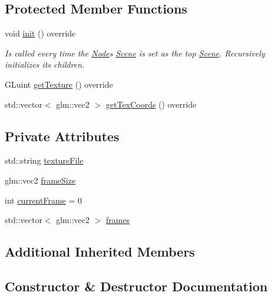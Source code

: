 \subsection*{Protected Member Functions}
\begin{DoxyCompactItemize}
\item 
void \mbox{\hyperlink{classsage_1_1Sprite_aeaf5c7aa5aeff1b0a4da9e66430f1c42}{init}} () override
\begin{DoxyCompactList}\small\item\em Is called every time the \mbox{\hyperlink{classsage_1_1Node}{Node}}\textquotesingle{}s \mbox{\hyperlink{classsage_1_1Scene}{Scene}} is set as the top \mbox{\hyperlink{classsage_1_1Scene}{Scene}}. Recursively initializes its children. \end{DoxyCompactList}\item 
G\+Luint \mbox{\hyperlink{classsage_1_1Sprite_aa75f3595b809f99847a9642ce2bf319a}{get\+Texture}} () override
\item 
std\+::vector$<$ glm\+::vec2 $>$ \mbox{\hyperlink{classsage_1_1Sprite_a3e5acc98484d2f326fdd1ff622cfd2ff}{get\+Tex\+Coords}} () override
\end{DoxyCompactItemize}
\subsection*{Private Attributes}
\begin{DoxyCompactItemize}
\item 
std\+::string \mbox{\hyperlink{classsage_1_1Sprite_a3ad65ff16f4f98a15f52092b1542838b}{texture\+File}}
\item 
glm\+::vec2 \mbox{\hyperlink{classsage_1_1Sprite_ae6d6160fb0c882acd8b786d2353208e6}{frame\+Size}}
\item 
int \mbox{\hyperlink{classsage_1_1Sprite_aae69224b9c75eb83097f02d484975f68}{current\+Frame}} = 0
\item 
std\+::vector$<$ glm\+::vec2 $>$ \mbox{\hyperlink{classsage_1_1Sprite_ad6aa87dfe1f1ce53e2de2df0aa10f229}{frames}}
\end{DoxyCompactItemize}
\subsection*{Additional Inherited Members}


\subsection{Constructor \& Destructor Documentation}
\mbox{\label{classsage_1_1Sprite_abae47a15ec83a91f3b714db14f2a492b}} 
